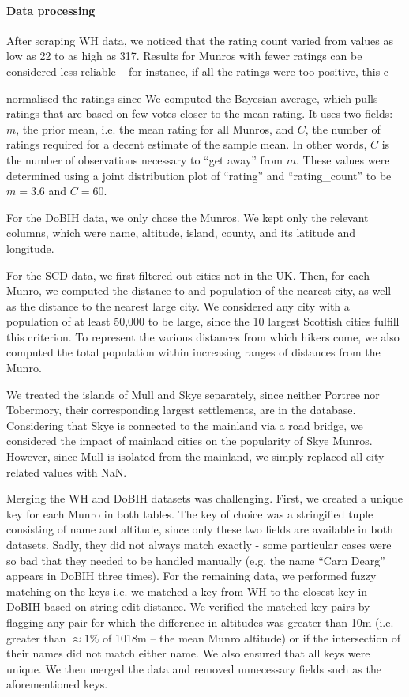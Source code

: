 \documentclass[11pt,a4paper]{article}
\begin{document}
\paragraph{Data processing}
After scraping WH data, we noticed that the rating count varied from values as low as 22 to as high as 317. Results for Munros with fewer ratings can be considered less reliable – for instance, if all the ratings were too positive, this c

normalised the ratings since  We computed the Bayesian average, which pulls ratings that are based on few votes closer to the mean rating. It uses two fields: $m$, the prior mean, i.e. the mean rating for all Munros, and $C$, the number of ratings required for a decent estimate of the sample mean. In other words, $C$ is the number of observations necessary to “get away” from $m$. These values were determined using a joint distribution plot of “rating” and “rating\_count” to be $m = 3.6$ and $C = 60$.

For the DoBIH data, we only chose the Munros. We kept only the relevant columns, which were name, altitude, island, county, and its latitude and longitude.

For the SCD data, we first filtered out cities not in the UK. Then, for each Munro, we computed the distance to and population of the nearest city, as well as the distance to the nearest large city. We considered any city with a population of at least 50,000 to be large, since the 10 largest Scottish cities fulfill this criterion. To represent the various distances from which hikers come, we also computed the total population within increasing ranges of distances from the Munro.

We treated the islands of Mull and Skye separately, since neither Portree nor Tobermory, their corresponding largest settlements, are in the database. Considering that Skye is connected to the mainland via a road bridge, we considered the impact of mainland cities on the popularity of Skye Munros. However, since Mull is isolated from the mainland, we simply replaced all city-related values with NaN.

Merging the WH and DoBIH datasets was challenging. First, we created a unique key for each Munro in both tables. The key of choice was a stringified tuple consisting of name and altitude, since only these two fields are available in both datasets. Sadly, they did not always match exactly - some particular cases were so bad that they needed to be handled manually (e.g. the name “Carn Dearg” appears in DoBIH three times). For the remaining data, we performed fuzzy matching on the keys i.e. we matched a key from WH to the closest key in DoBIH based on string edit-distance. We verified the matched key pairs by flagging any pair for which the difference in altitudes was greater than 10m (i.e. greater than $\approx1\%$ of 1018m – the mean Munro altitude) or if the intersection of their names did not match either name. We also ensured that all keys were unique. We then merged the data and removed unnecessary fields such as the aforementioned keys.
\end{document}

